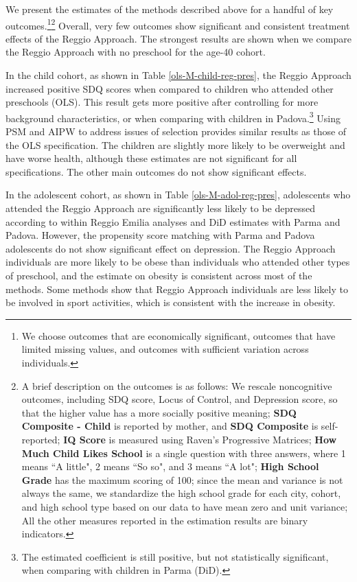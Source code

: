 We present the estimates of the methods described above for a handful of key outcomes.\footnote{We choose outcomes that are economically significant,  outcomes that have limited missing values, and outcomes with sufficient variation across individuals.}\footnote{A brief description on the outcomes is as follows: We rescale noncognitive outcomes, including SDQ score, Locus of Control, and Depression score, so that the higher value has a more socially positive meaning; \textbf{SDQ Composite - Child} is reported by mother, and \textbf{SDQ Composite} is self-reported; \textbf{IQ Score} is measured using Raven's Progressive Matrices; \textbf{How Much Child Likes School} is a single question with three answers, where 1 means ``A little", 2 means ``So so", and 3 means ``A lot";  \textbf{High School Grade} has the maximum scoring of 100; since the mean and variance is not always the same, we standardize the high school grade for each city, cohort, and high school type based on our data to have mean zero and unit variance; All the other measures reported in the estimation results are binary indicators.} Overall, very few outcomes show significant and consistent treatment effects of the Reggio Approach. The strongest results are shown when we compare the Reggio Approach with no preschool for the age-40 cohort. 

In the child cohort, as shown in Table \ref{ols-M-child-reg-pres}, the Reggio Approach increased positive SDQ scores when compared to children who attended other preschools (OLS). This result gets more positive after controlling for more background characteristics, or when comparing with children in Padova.\footnote{The estimated coefficient is still positive, but not statistically significant, when comparing with children in Parma (DiD).} Using PSM and AIPW to address issues of selection provides similar results as those of the OLS specification. The children are slightly more likely to be overweight and have worse health, although these estimates are not significant for all specifications. The other main outcomes do not show significant effects.

In the adolescent cohort, as shown in Table \ref{ols-M-adol-reg-pres}, adolescents who attended the Reggio Approach are significantly less likely to be depressed according to within Reggio Emilia analyses and DiD estimates with Parma and Padova. However, the propensity score matching with Parma and Padova adolescents do not show significant effect on depression. The Reggio Approach individuals are more likely to be obese than individuals who attended other types of preschool, and the estimate on obesity is consistent across most of the methods. Some methods show that Reggio Approach individuals are less likely to be involved in sport activities, which is consistent with the increase in obesity. 

